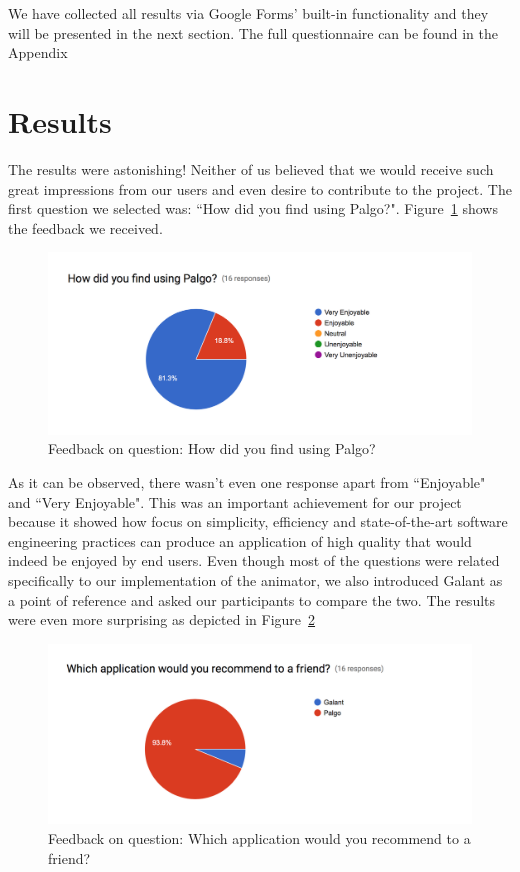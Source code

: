 \documentclass{l4proj}
\begin{document}
We have collected all results via Google Forms' built-in functionality and they will be presented in the next section.
The full questionnaire can be found in the Appendix

\section{Results}

The results were astonishing! Neither of us believed that we would receive such great impressions from our users and
even desire to contribute to the project. The first question we selected was: ``How did you find using Palgo?".
Figure~\ref{fig:questionnaire-1} shows the feedback we received.

\begin{figure}[!ht]
    \centering
    \includegraphics[scale=0.6]{questionnaire-1}
    \caption{Feedback on question: How did you find using Palgo?}
    \label{fig:questionnaire-1}
\end{figure}

As it can be observed, there wasn't even one response apart from ``Enjoyable" and ``Very Enjoyable". This was an
important achievement for our project because it showed how focus on simplicity, efficiency and state-of-the-art
software engineering practices
can produce an application of high quality that would indeed be enjoyed by end users. Even though most of the questions
were related specifically to our implementation of the animator, we also introduced Galant as a point of reference and
asked our participants to compare the two. The results were even more surprising as depicted in
Figure~\ref{fig:questionnaire-2}

\begin{figure}[!ht]
    \centering
    \includegraphics[scale=0.6]{questionnaire-2}
    \caption{Feedback on question: Which application would you recommend to a friend?}
    \label{fig:questionnaire-2}
\end{figure}
\end{document}
